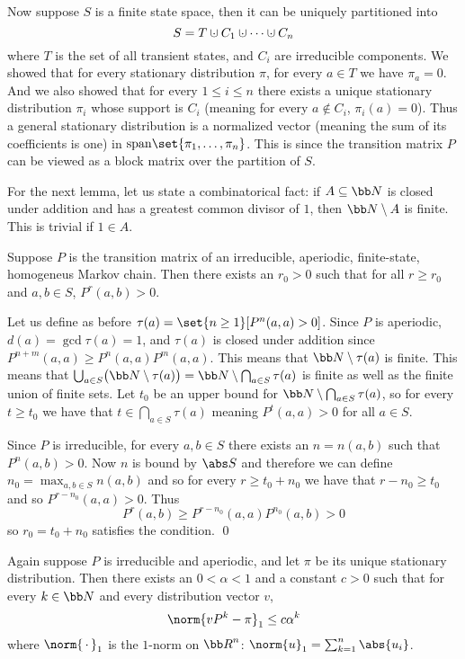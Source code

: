 Now suppose $S$ is a finite state space, then it can be uniquely partitioned into
$$ S = T\dcup C_1\dcup\cdots\dcup C_n $$
where $T$ is the set of all transient states, and $C_i$ are irreducible components.
We showed that for every stationary distribution $\pi$, for every $a\in T$ we have $\pi_a=0$.
And we also showed that for every $1\leq i\leq n$ there exists a unique stationary distribution $\pi_i$ whose support is $C_i$ (meaning for every $a\notin C_i$, $\pi_i(a)=0$).
Thus a general stationary distribution is a normalized vector (meaning the sum of its coefficients is one) in ${\rm span}\set{\pi_1,\dots,\pi_n}$.
This is since the transition matrix $P$ can be viewed as a block matrix over the partition of $S$.

For the next lemma, let us state a combinatorical fact: if $A\subseteq{\bb N}$ is closed under addition and has a greatest common divisor of $1$, then ${\bb N}\setminus A$ is finite.
This is trivial if $1\in A$.

\blemm

    Suppose $P$ is the transition matrix of an irreducible, aperiodic, finite-state, homogeneus Markov chain.
    Then there exists an $r_0>0$ such that for all $r\geq r_0$ and $a,b\in S$, $P^r(a,b)>0$.

\elemm

Let us define as before $\tau(a)=\set{n\geq1}[P^n(a,a)>0]$.
Since $P$ is aperiodic, $d(a)=\gcd\tau(a)=1$, and $\tau(a)$ is closed under addition since $P^{n+m}(a,a)\geq P^n(a,a)P^m(a,a)$.
This means that ${\bb N}\setminus\tau(a)$ is finite.
This means that $\bigcup_{a\in S}\bigl({\bb N}\setminus\tau(a)\bigr)={\bb N}\setminus\bigcap_{a\in S}\tau(a)$ is finite as well as the finite union of finite sets.
Let $t_0$ be an upper bound for ${\bb N}\setminus\bigcap_{a\in S}\tau(a)$, so for every $t\geq t_0$ we have that $t\in\bigcap_{a\in S}\tau(a)$ meaning $P^t(a,a)>0$ for all $a\in S$.

Since $P$ is irreducible, for every $a,b\in S$ there exists an $n=n(a,b)$ such that $P^n(a,b)>0$.
Now $n$ is bound by $\abs S$ and therefore we can define $n_0=\max_{a,b\in S}n(a,b)$ and so for every $r\geq t_0+n_0$ we have that $r-n_0\geq t_0$ and so $P^{r-n_0}(a,a)>0$.
Thus
$$ P^r(a,b) \geq P^{r-n_0}(a,a)P^{n_0}(a,b) > 0 $$
so $r_0=t_0+n_0$ satisfies the condition.
\qed

\blemm

    Again suppose $P$ is irreducible and aperiodic, and let $\pi$ be its unique stationary distribution.
    Then there exists an $0<\alpha<1$ and a constant $c>0$ such that for every $k\in{\bb N}$ and every distribution vector $v$,
    $$ \norm{vP^k-\pi}_1 \leq c\alpha^k $$
    where $\norm{\,\cdot\,}_1$ is the $1$-norm on ${\bb R}^n$: $\norm{u}_1=\sum_{k=1}^n\abs{u_i}$.

